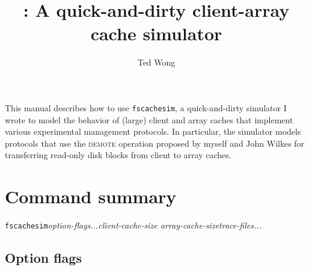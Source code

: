 \documentclass[twoside]{article}
\title{\fscachesim: A quick-and-dirty client-array cache simulator}
\author{Ted Wong}
\date{}
\newcommand{\fscachesim}{\texttt{fscachesim}}
\begin{document}
\maketitle

%
%
%

This manual describes how to use \fscachesim, a quick-and-dirty simulator I
wrote to model the behavior of (large) client and array caches that
implement various experimental management protocols. In particular, the
simulator models protocols that use the \textsc{demote} operation proposed
by myself and John Wilkes \cite{Wong2000} for transferring read-only disk
blocks from client to array caches.

%
%
%

\section{Command summary}

\fscachesim{}\quad \textit{option-flags...\quad client-cache-size\quad
array-cache-size\quad trace-files...}

\subsection{Option flags}
\end{document}
